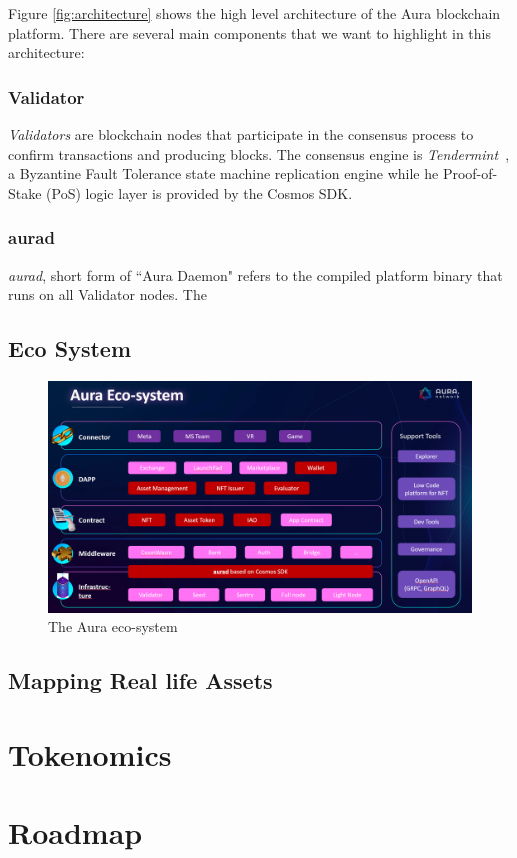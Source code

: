 \documentclass[12pt]{article}
\begin{document}
Figure \ref{fig:architecture} shows the high level architecture of the Aura blockchain platform. There are several main components that we want to highlight in this architecture:

\subsubsection*{Validator}
\emph{Validators} are blockchain nodes that participate in the consensus process to confirm transactions and producing blocks.
The consensus engine is \emph{Tendermint}~\cite{buchman2016tendermint}, a Byzantine Fault Tolerance state machine replication engine while he Proof-of-Stake (PoS) logic layer is provided by the Cosmos SDK. 

\subsubsection*{aurad}
\emph{aurad}, short form of ``Aura Daemon" refers to the compiled platform binary that runs on all Validator nodes. The  

\subsection{Eco System}
\begin{figure}[ht]
\label{fig:auraeco}
\includegraphics[width=14cm]{img/auraeco.png}
\centering
\caption{The Aura eco-system}
\end{figure}

\subsection{Mapping Real life Assets}


\section{Tokenomics}

\section{Roadmap}



\end{document}
